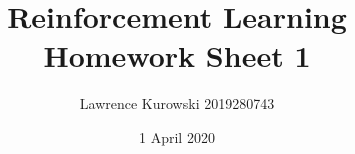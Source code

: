 \documentclass[a4paper,twoside,12pt,fleqn]{scrartcl}
\begin{document}
\title{Reinforcement Learning\\Homework Sheet 1}
\subtitle{Lawrence Kurowski 2019280743}
\date{1 April 2020}
\maketitle






%
\end{document}
